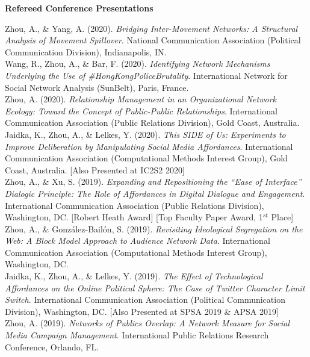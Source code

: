 \documentclass[12pt, letterpaper]{article}
\newcommand{\years}[1]{\marginnote{\normalsize #1}}
\begin{document}
{\textbf{Refereed Conference Presentations}

\years{[12]} Zhou, A., \& Yang, A. (2020). \textit{Bridging Inter-Movement Networks: A Structural Analysis of Movement Spillover}. National Communication Association (Political Communication Division), Indianapolis, IN.\\
\years{[11]} Wang, R., Zhou, A., \& Bar, F. (2020). \textit{Identifying Network Mechanisms Underlying the Use of \#HongKongPoliceBrutality}. International Network for Social Network Analysis (SunBelt), Paris, France.\\
\years{[10]} Zhou, A. (2020). \textit{Relationship Management in an Organizational Network Ecology: Toward the Concept of Public-Public Relationships}. International Communication Association (Public Relations Division), Gold Coast, Australia.\\
\years{[9]} Jaidka, K., Zhou, A., \& Lelkes, Y. (2020). \textit{This SIDE of Us: Experiments to Improve Deliberation by Manipulating Social Media Affordances}. International Communication Association (Computational Methods Interest Group), Gold Coast, Australia. [Also Presented at IC2S2 2020]\\
  \years{[8]} Zhou, A., \& Xu, S. (2019). \textit{Expanding and Repositioning the ``Ease of Interface'' Dialogic Principle: The Role of Affordances in Digital Dialogue and Engagement}. International Communication Association (Public Relations Division), Washington, DC. [Robert Heath Award] [Top Faculty Paper Award, 1$^{st}$ Place]\\
  \years{[7]} Zhou, A., \& González-Bailón, S. (2019). \textit{Revisiting Ideological Segregation on the Web: A Block Model Approach to Audience Network Data}. International Communication Association (Computational Methods Interest Group), Washington, DC.\\
  \years{[6]} Jaidka, K., Zhou, A., \& Lelkes, Y. (2019). \textit{The Effect of Technological Affordances on the Online Political Sphere: The Case of Twitter Character Limit Switch}. International Communication Association (Political Communication Division), Washington, DC. [Also Presented at SPSA 2019 \& APSA 2019]\\
  \years{[5]} Zhou, A. (2019). \textit{Networks of Publics Overlap: A Network Measure for Social Media Campaign Management}. International Public Relations Research Conference, Orlando, FL.\\
}
\end{document}
